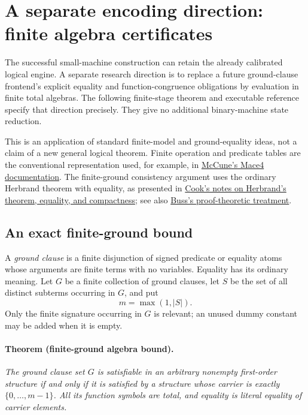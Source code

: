 \section{A separate encoding direction: finite algebra certificates}
\label{sec:finite-algebra}

The successful small-machine construction can retain the already calibrated
logical engine.  A separate research direction is to replace a future
ground-clause frontend's explicit equality and function-congruence obligations
by evaluation in finite total algebras.  The following finite-stage theorem
and executable reference specify that direction precisely.  They give no
additional binary-machine state reduction.

This is an application of standard finite-model and ground-equality ideas,
not a claim of a new general logical theorem.  Finite operation and predicate
tables are the conventional representation used, for example, in
\href{https://www.cs.unm.edu/~mccune/prover9/manual/2009-02A/mace4.html}
{McCune's Mace4 documentation}.  The finite-ground consistency argument uses
the ordinary Herbrand theorem with equality, as presented in
\href{https://www.cs.toronto.edu/~sacook/csc438h/notes/page39.pdf}
{Cook's notes on Herbrand's theorem, equality, and compactness}; see also
\href{https://math.ucsd.edu/~sbuss/ResearchWeb/herbrandtheorem/paper.pdf}
{Buss's proof-theoretic treatment}.

\subsection{An exact finite-ground bound}

A \emph{ground clause} is a finite disjunction of signed predicate or equality
atoms whose arguments are finite terms with no variables.  Equality has its
ordinary meaning.  Let $G$ be a finite collection of ground clauses, let $S$
be the set of all distinct subterms occurring in $G$, and put
\[
 m=\max(1,|S|).
\]
Only the finite signature occurring in $G$ is relevant; an unused dummy
constant may be added when it is empty.

\paragraph{Theorem (finite-ground algebra bound).}
\emph{The ground clause set $G$ is satisfiable in an arbitrary nonempty
first-order structure if and only if it is satisfied by a structure whose
carrier is exactly $\{0,\ldots,m-1\}$.  All its function symbols are total,
and equality is literal equality of carrier elements.}

